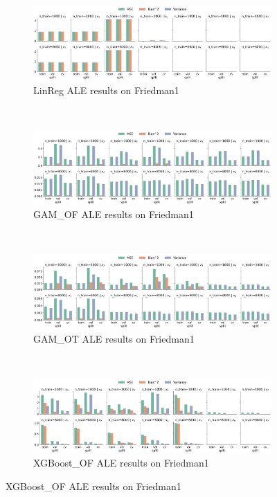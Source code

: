 \documentclass[runningheads]{llncs}
\begin{document}
\begin{figure}[h!]
    \centering
    \begin{subfigure}[b]{\textwidth}
        \centering
        \includegraphics[width=\textwidth]{img/Friedman1-all/feature_effect_errors_ale_LinReg.png}
        \caption{LinReg ALE results on Friedman1}
    \end{subfigure}
    \\[10pt]
    \vfill
    \begin{subfigure}[b]{\textwidth}
        \centering
        \includegraphics[width=\textwidth]{img/Friedman1-all/feature_effect_errors_ale_GAM_OF.png}
        \caption{GAM\_OF ALE results on Friedman1}
    \end{subfigure}
    \\[10pt]
    \vfill
    \begin{subfigure}[b]{\textwidth}
        \centering
        \includegraphics[width=\textwidth]{img/Friedman1-all/feature_effect_errors_ale_GAM_OT.png}
        \caption{GAM\_OT ALE results on Friedman1}
    \end{subfigure}
    \\[10pt]
    \vfill
    \begin{subfigure}[b]{\textwidth}
        \centering
        \includegraphics[width=\textwidth]{img/Friedman1-all/feature_effect_errors_ale_XGBoost_OF.png}
        \caption{XGBoost\_OF ALE results on Friedman1}
    \end{subfigure}
\end{figure}
\end{document}

